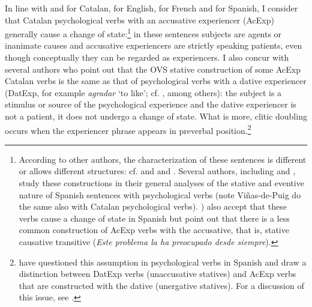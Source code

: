 \documentclass[output=paper,colorlinks,citecolor=brown,nonflat,modfonts]{langsci/langscibook}
\begin{document}
In line with \citet{Ynglès1991, CabréMateu1998, Rossello2008} and \citet[Section 21.5]{GIEC2016} for Catalan, \citet{Pesetsky1995} for English, \citet{Bouchard1995} for French and \citet{Acedo-MatellánMateu2015} for Spanish, I consider that Catalan psychological verbs with an accusative experiencer (AcExp) generally cause a change of state:\footnote{According to other authors, the characterization of these sentences is different or allows different structures: cf. \citet{vanVoorst1992, Arad1999, Landau2010} and \citet{MarínMcNally2011} and \citet{Fabregas2015experimentante}. Several authors, including \citet{FabregasMarín2012,FábregasMarínMcNally2012,MarínSanchezMarco2012,Ganeshan2014} and \citet{Viñas-de-Puig2014}, study these constructions in their general analyses of the stative and eventive nature of Spanish sentences with psychological verbs (note Viñas-de-Puig do the same also with Catalan psychological verbs). \citet[83 (4)]{Acedo-MatellánMateu2015}) also accept that these verbs cause a change of state in Spanish but point out that there is a less common construction of AcExp verbs with the accusative, that is, stative causative transitive (\textit{Este problema la ha preocupado desde siempre}).} in these sentences subjects are agents or inanimate causes and accusative experiencers are strictly speaking patients, even though conceptually they can be regarded as experiencers. I also concur with several authors who point out that the OVS stative construction of some AcExp Catalan verbs is the same as that of psychological verbs with a dative experiencer (DatExp, for example \textit{agradar} ‘to like’; cf. \citealt{CabréMateu1998, Ramos2004, Rossello2008, Cuervo2010Cuestiones}, among others): the subject is a stimulus or source of the psychological experience and the dative experiencer is not a patient, it does not undergo a change of state. What is more, clitic doubling occurs when the experiencer phrase appears in preverbal position.\footnote{\citet{Acedo-MatellánMateu2015} have questioned this assumption in psychological verbs in Spanish and draw a distinction between DatExp verbs (unaccusative statives) and AcExp verbs that are constructed with the dative (unergative statives). For a discussion of this issue, see \citet[Section 6.2.4.1]{Royo2017}.}
\end{document}
